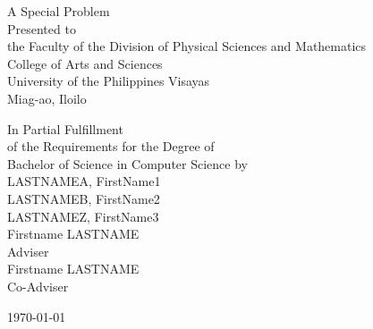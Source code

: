 \begin{titlepage}
\centering


\vspace{0.875cm}
A Special Problem\\
Presented to\\
the Faculty of the Division of Physical Sciences and Mathematics\\
College of Arts and Sciences\\
University of the Philippines Visayas\\
Miag-ao, Iloilo

\vspace{0.875cm}
In Partial Fulfillment\\
of the Requirements for the Degree of\\
Bachelor of Science in Computer Science
\vspace{1.75cm}
by\\

\vspace{0.1cm}
LASTNAMEA, FirstName1  \\
LASTNAMEB, FirstName2  \\
LASTNAMEZ, FirstName3  \\

\vspace{0.875cm}
Firstname LASTNAME \\
Adviser\\
Firstname LASTNAME \\
Co-Adviser

\vspace{0.875cm}
\today
\end{titlepage}
